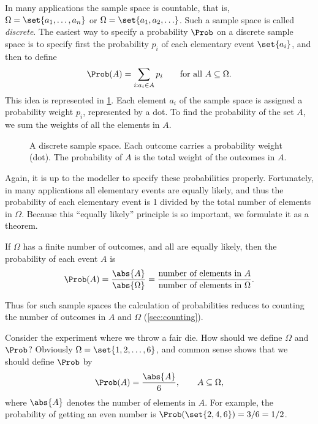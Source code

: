 In many applications the sample space is countable, that is, $\Omega = \set{a_1, \ldots, a_n}$ or $\Omega = \set{a_1, a_2, \ldots}$. Such a sample space is called \emph{discrete}. The easiest way to specify a probability $\Prob$ on a discrete sample space is to specify first the probability $p_i$ of each elementary event $\set{a_i}$, and then to define
\[
  \Prob(A) = \sum_{i : a_i \in A} p_i \qquad \text{for all } A \subseteq \Omega.
\]
This idea is represented in \cref{fig:discrete-sample-space}. Each element $a_i$ of the sample space is assigned a probability weight $p_i$, represented by a dot. To find the probability of the set $A$, we sum the weights of all the elements in $A$.

\begin{figure}[ht]
\centering
{}
\caption{A discrete sample space. Each outcome carries a probability weight (dot). The probability of $A$ is the total weight of the outcomes in $A$.}
\label{fig:discrete-sample-space}
\end{figure}

Again, it is up to the modeller to specify these probabilities properly. Fortunately, in many applications all elementary events are equally likely, and thus the probability of each elementary event is 1 divided by the total number of elements in $\Omega$. Because this ``equally likely'' principle is so important, we formulate it as a theorem.

\begin{theorem}\label{thm:equilikely-principle}
If $\Omega$ has a finite number of outcomes, and all are equally likely, then the probability of each event $A$ is
\[
  \Prob(A) = \frac{\abs{A}}{\abs{\Omega}} = \frac{\text{number of elements in } A}{\text{number of elements in } \Omega}.
\]
\end{theorem}

Thus for such sample spaces the calculation of probabilities reduces to counting the number of outcomes in $A$ and $\Omega$ (\cref{sec:counting}).

\begin{example}\label{ex:fair-die}
Consider the experiment where we throw a fair die. How should we define $\Omega$ and $\Prob$? Obviously $\Omega = \set{1, 2, \ldots, 6}$, and common sense shows that we should define $\Prob$ by
\[
  \Prob(A) = \frac{\abs{A}}{6}, \qquad A \subseteq \Omega,
\]
where $\abs{A}$ denotes the number of elements in $A$. For example, the probability of getting an even number is $\Prob(\set{2, 4, 6}) = 3/6 = 1/2$.
\end{example}

